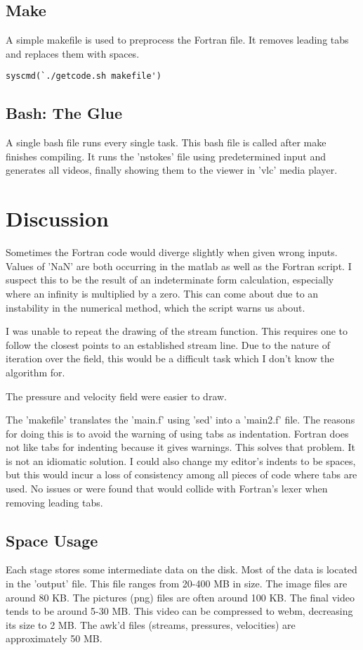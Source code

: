 \documentclass[listof=totoc]{report}
\begin{document}
\section{Make}
A simple makefile is used to preprocess the Fortran file. It removes leading tabs and replaces them with spaces.

\begin{verbatim}
syscmd(`./getcode.sh makefile')
\end{verbatim}

\section{Bash: The Glue}
A single bash file runs every single task. This bash file is called after make finishes compiling. It runs the 'nstokes' file using predetermined input and generates all videos, finally showing them to the viewer in 'vlc' media player.

\chapter{Discussion}
Sometimes the Fortran code would diverge slightly when given wrong inputs. Values of 'NaN' are both occurring in the matlab as well as the Fortran script. I suspect this to be the result of an indeterminate form calculation, especially where an infinity is multiplied by a zero. This can come about due to an instability in the numerical method, which the script warns us about.

I was unable to repeat the drawing of the stream function. This requires one to follow the closest points to an established stream line. Due to the nature of iteration over the field, this would be a difficult task which I don't know the algorithm for.

The pressure and velocity field were easier to draw.

The 'makefile' translates the 'main.f' using 'sed' into a 'main2.f' file. The reasons for doing this is to avoid the warning of using tabs as indentation. Fortran does not like tabs for indenting because it gives warnings. This solves that problem. It is not an idiomatic solution. I could also change my editor's indents to be spaces, but this would incur a loss of consistency among all pieces of code where tabs are used. No issues or were found that would collide with Fortran's lexer when removing leading tabs.

\section{Space Usage}
Each stage stores some intermediate data on the disk. Most of the data is located in the 'output' file. This file ranges from 20-400 MB in size. The image files are around 80 KB. The pictures (png) files are often around 100 KB. The final video tends to be around 5-30 MB. This video can be compressed to webm, decreasing its size to 2 MB. The awk'd files (streams, pressures, velocities) are approximately 50 MB.
\end{document}
